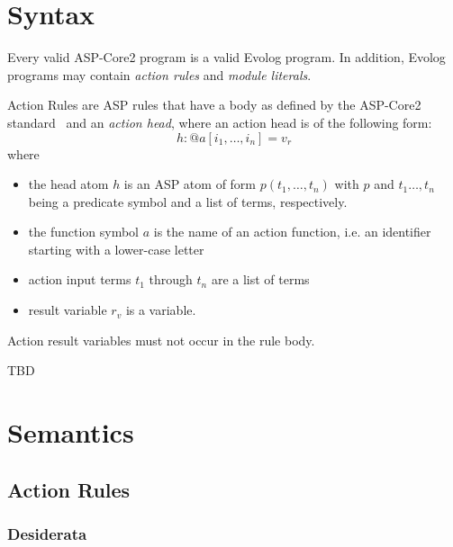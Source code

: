 \section{Syntax}
\label{sec:lang-syntax}

Every valid ASP-Core2 program is a valid Evolog program. In addition, Evolog programs may contain \emph{action rules} and \emph{module literals}.

\begin{definition}
\label{def:action-rule}
Action Rules are ASP rules that have a body as defined by the ASP-Core2 standard~\cite{asp-core2} and an \emph{action head}, where an action head is of the following form:
\[
h : @a[i_1,\ldots,i_n] = v_r
\]
where
	\begin{itemize}
		\item the head atom $h$ is an ASP atom of form $p(t_1,\ldots,t_n)$ with $p$ and $t_1 \ldots,t_n$ being a predicate symbol and a list of terms, respectively.
		\item the function symbol $a$ is the name of an action function, i.e. an identifier starting with a lower-case letter
		\item action input terms $t_1$ through $t_n$ are a list of terms
		\item result variable $r_v$  is a variable.
	\end{itemize}
\end{definition}

Action result variables must not occur in the rule body.

\begin{definition}
TBD
\end{definition}

\section{Semantics}
\label{sec:lang-semantics}

\subsection{Action Rules}
\label{sec:lang-semantics:action-rules}

\subsubsection*{Desiderata}

